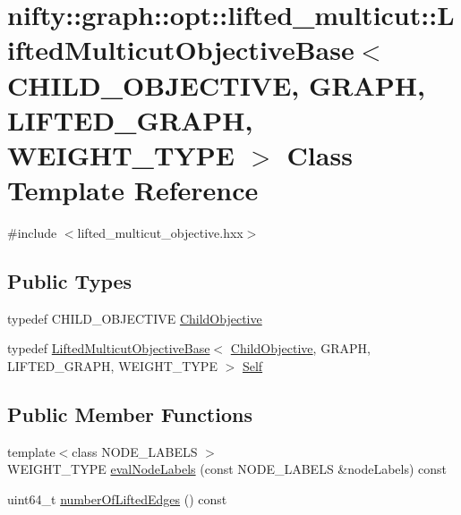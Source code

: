 \hypertarget{classnifty_1_1graph_1_1opt_1_1lifted__multicut_1_1LiftedMulticutObjectiveBase}{}\section{nifty\+:\+:graph\+:\+:opt\+:\+:lifted\+\_\+multicut\+:\+:Lifted\+Multicut\+Objective\+Base$<$ C\+H\+I\+L\+D\+\_\+\+O\+B\+J\+E\+C\+T\+I\+VE, G\+R\+A\+PH, L\+I\+F\+T\+E\+D\+\_\+\+G\+R\+A\+PH, W\+E\+I\+G\+H\+T\+\_\+\+T\+Y\+PE $>$ Class Template Reference}
\label{classnifty_1_1graph_1_1opt_1_1lifted__multicut_1_1LiftedMulticutObjectiveBase}


{\ttfamily \#include $<$lifted\+\_\+multicut\+\_\+objective.\+hxx$>$}

\subsection*{Public Types}
\begin{DoxyCompactItemize}
\item 
typedef C\+H\+I\+L\+D\+\_\+\+O\+B\+J\+E\+C\+T\+I\+VE \hyperlink{classnifty_1_1graph_1_1opt_1_1lifted__multicut_1_1LiftedMulticutObjectiveBase_a9528ca24d93bf9dc7fd156993588d9fc}{Child\+Objective}
\item 
typedef \hyperlink{classnifty_1_1graph_1_1opt_1_1lifted__multicut_1_1LiftedMulticutObjectiveBase}{Lifted\+Multicut\+Objective\+Base}$<$ \hyperlink{classnifty_1_1graph_1_1opt_1_1lifted__multicut_1_1LiftedMulticutObjectiveBase_a9528ca24d93bf9dc7fd156993588d9fc}{Child\+Objective}, G\+R\+A\+PH, L\+I\+F\+T\+E\+D\+\_\+\+G\+R\+A\+PH, W\+E\+I\+G\+H\+T\+\_\+\+T\+Y\+PE $>$ \hyperlink{classnifty_1_1graph_1_1opt_1_1lifted__multicut_1_1LiftedMulticutObjectiveBase_a415ea8a76d9a7c8a6ba833e8fa1a7d78}{Self}
\end{DoxyCompactItemize}
\subsection*{Public Member Functions}
\begin{DoxyCompactItemize}
\item 
{\footnotesize template$<$class N\+O\+D\+E\+\_\+\+L\+A\+B\+E\+LS $>$ }\\W\+E\+I\+G\+H\+T\+\_\+\+T\+Y\+PE \hyperlink{classnifty_1_1graph_1_1opt_1_1lifted__multicut_1_1LiftedMulticutObjectiveBase_a04477c5ef3569c1b4123a28fb35013b0}{eval\+Node\+Labels} (const N\+O\+D\+E\+\_\+\+L\+A\+B\+E\+LS \&node\+Labels) const
\item 
uint64\+\_\+t \hyperlink{classnifty_1_1graph_1_1opt_1_1lifted__multicut_1_1LiftedMulticutObjectiveBase_a160eb5442bde1db8baf76698ede37947}{number\+Of\+Lifted\+Edges} () const
\end{DoxyCompactItemize}


